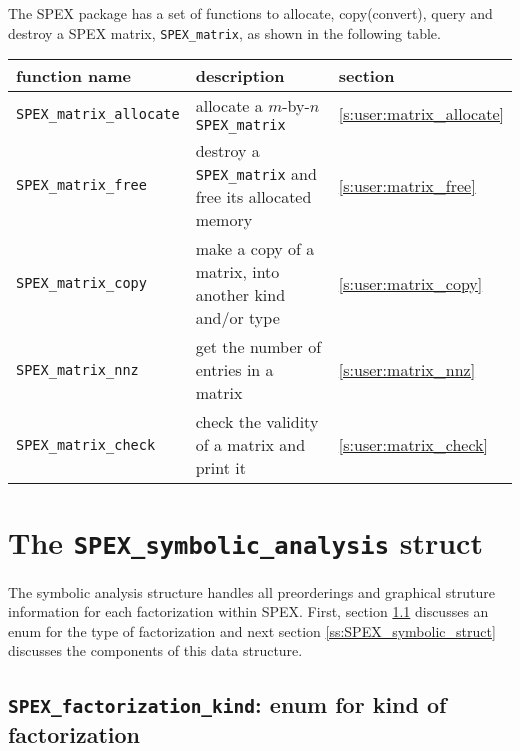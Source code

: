\documentclass[12pt]{report}
\theoremstyle{definition}
\begin{document}
The SPEX package has a set of functions to allocate, copy(convert), query and
destroy a SPEX matrix, \verb|SPEX_matrix|, as shown in the following table.

{\small
\begin{center}
\begin{tabular}{lp{2.5in}l}
\hline
function name & description & section \\
\hline
\verb|SPEX_matrix_allocate|
    & allocate a $m$-by-$n$ \verb|SPEX_matrix|
    & \ref{s:user:matrix_allocate} \\
\hline
\verb|SPEX_matrix_free|
    & destroy a \verb|SPEX_matrix| and free its allocated memory
    & \ref{s:user:matrix_free} \\
\hline
\verb|SPEX_matrix_copy|
    & make a copy of a matrix, into another kind and/or type
    & \ref{s:user:matrix_copy} \\
\hline
\verb|SPEX_matrix_nnz|
    & get the number of entries in a matrix
    & \ref{s:user:matrix_nnz} \\
\hline
\verb|SPEX_matrix_check|
    & check the validity of a matrix and print it
    & \ref{s:user:matrix_check} \\
\hline
\end{tabular}
\end{center}
}

\section{The \texttt{SPEX\_symbolic\_analysis} struct} \label{s:spex_symbolic_analysis}

The symbolic analysis structure handles all preorderings and graphical struture information for each factorization within SPEX. First, section \ref{ss:spex_factorization_kind} discusses an enum for the type of factorization and next section \ref{ss:SPEX_symbolic_struct} discusses the components of this data structure.

\subsection{\texttt{SPEX\_factorization\_kind}: enum for kind of factorization}
\label{ss:spex_factorization_kind}
\end{document}
